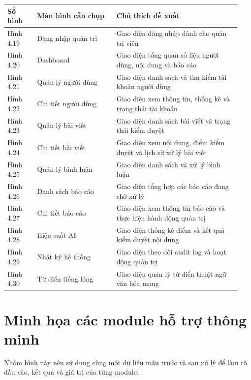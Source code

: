 {\def\LTcaptype{none}
\begin{longtable}{
  |>{\centering\arraybackslash}p{0.12\linewidth}
  |>{\raggedright\arraybackslash}p{0.32\linewidth}
  |>{\raggedright\arraybackslash}p{0.50\linewidth}|}
\hline
\textbf{Số hình} & \textbf{Màn hình cần chụp} & \textbf{Chú thích đề xuất} \\ \hline
\endhead
\hline
\endlastfoot
Hình 4.19 & Đăng nhập quản trị & Giao diện đăng nhập dành cho quản trị viên \\ \hline
Hình 4.20 & Dashboard & Giao diện tổng quan số liệu người dùng, nội dung và báo cáo \\ \hline
Hình 4.21 & Quản lý người dùng & Giao diện danh sách và tìm kiếm tài khoản người dùng \\ \hline
Hình 4.22 & Chi tiết người dùng & Giao diện xem thông tin, thống kê và trạng thái tài khoản \\ \hline
Hình 4.23 & Quản lý bài viết & Giao diện danh sách bài viết và trạng thái kiểm duyệt \\ \hline
Hình 4.24 & Chi tiết bài viết & Giao diện xem nội dung, điểm kiểm duyệt và lịch sử xử lý bài viết \\ \hline
Hình 4.25 & Quản lý bình luận & Giao diện danh sách và xử lý bình luận \\ \hline
Hình 4.26 & Danh sách báo cáo & Giao diện tổng hợp các báo cáo đang chờ xử lý \\ \hline
Hình 4.27 & Chi tiết báo cáo & Giao diện xem thông tin báo cáo và thực hiện hành động quản trị \\ \hline
Hình 4.28 & Hiệu suất AI & Giao diện thống kê điểm và kết quả kiểm duyệt nội dung \\ \hline
Hình 4.29 & Nhật ký hệ thống & Giao diện theo dõi audit log và hoạt động quản trị \\ \hline
Hình 4.30 & Từ điển tiếng lóng & Giao diện quản lý từ điển thuật ngữ văn hóa mạng \\ \hline
\end{longtable}
}

\section{Minh họa các module hỗ trợ thông minh}

Nhóm hình này nên sử dụng cùng một dữ liệu mẫu trước và sau xử lý để làm
rõ đầu vào, kết quả và giá trị của từng module.

